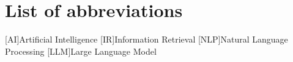 \chapter*{List of abbreviations}

\begin{acronym}[XXXXXXXXX]
    [AI]{Artificial Intelligence}
    [IR]{Information Retrieval}
    [NLP]{Natural Language Processing}
    [LLM]{Large Language Model}
   
\end{acronym}
